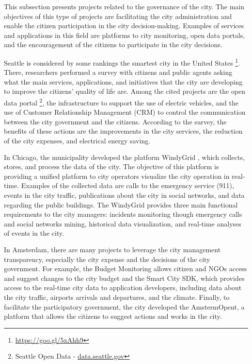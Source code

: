 This subsection presents projects related to the governance of the city. The main objectives of this type of projects are facilitating the city administration and enable the citizen participation in the city decision-making. Examples of services and applications in this field are platforms to city monitoring, open data portals, and the encouragement of the citizens to participate in the city decisions.

Seattle is considered by some rankings the smartest city in the United States \footnote{\url{https://goo.gl/5xAhh9}}.
There, researchers performed a survey \citep{alawadhi2013aspirations} with citizens and public agents asking what the main services, applications, and initiatives that the city are developing to improve the citizens' quality of life are. Among the cited projects are the open data portal \footnote{Seattle Open Data - \url{data.seattle.gov}}, the infrastructure to support the use of electric vehicles, and the use of Customer Relationship Management (CRM) to control the communication between the city government and the citizens. According to the survey, the benefits of these actions are the improvements in the city services, the reduction of the city expenses, and electrical energy saving. 

In Chicago, the municipality developed the platform WindyGrid \citep{thornton13windygrid}, which collects, stores, and process the data of the city. The objective of this platform is providing a unified platform to city operators visualize the city operation in real-time. Examples of the collected data are calls to the emergency service (911), events in the city traffic, publications about the city in social networks, and data regarding the public buildings. The WindyGrid provides three main functional requirements to the city managers: incidents monitoring though emergency calls and social networks mining, historical data visualization, and real-time analyses of events in the city.


In Amsterdam, there are many projects to leverage the city management transparency, especially the city expense and the decisions of the city government. For example, the Budget Monitoring allows citizen and NGOs access and suggest changes to the city budget and the Smart City SDK, which provides access to the real-time city data to application developers, including data about the city traffic, airports arrivals and departures, and the climate. Finally, to facilitate the participatory government, the city developed the AmstermOpent, a platform that allows the citizens to suggest actions and works in the city.

